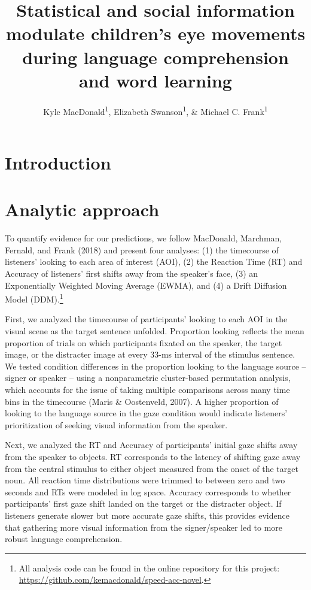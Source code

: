 \documentclass[man,floatsintext]{apa6}
\title{Statistical and social information modulate children's eye movements
during language comprehension and word learning}
\author{Kyle MacDonald\textsuperscript{1}, Elizabeth Swanson\textsuperscript{1},
\& Michael C. Frank\textsuperscript{1}}
\date{}
\affiliation{
\vspace{0.5cm}
\textsuperscript{1} Stanford University}
\let\rmarkdownfootnote\footnote%
\def\footnote{\protect\rmarkdownfootnote}
\begin{document}
\maketitle

\section{Introduction}\label{introduction}

\section{Analytic approach}\label{analytic-approach}

To quantify evidence for our predictions, we follow MacDonald, Marchman,
Fernald, and Frank (2018) and present four analyses: (1) the timecourse
of listeners' looking to each area of interest (AOI), (2) the Reaction
Time (RT) and Accuracy of listeners' first shifts away from the
speaker's face, (3) an Exponentially Weighted Moving Average (EWMA), and
(4) a Drift Diffusion Model (DDM).\footnote{All analysis code can be
  found in the online repository for this project:
  \url{https://github.com/kemacdonald/speed-acc-novel}.}

First, we analyzed the timecourse of participants' looking to each AOI
in the visual scene as the target sentence unfolded. Proportion looking
reflects the mean proportion of trials on which participants fixated on
the speaker, the target image, or the distracter image at every 33-ms
interval of the stimulus sentence. We tested condition differences in
the proportion looking to the language source -- signer or speaker --
using a nonparametric cluster-based permutation analysis, which accounts
for the issue of taking multiple comparisons across many time bins in
the timecourse (Maris \& Oostenveld, 2007). A higher proportion of
looking to the language source in the gaze condition would indicate
listeners' prioritization of seeking visual information from the
speaker.

Next, we analyzed the RT and Accuracy of participants' initial gaze
shifts away from the speaker to objects. RT corresponds to the latency
of shifting gaze away from the central stimulus to either object
measured from the onset of the target noun. All reaction time
distributions were trimmed to between zero and two seconds and RTs were
modeled in log space. Accuracy corresponds to whether participants'
first gaze shift landed on the target or the distracter object. If
listeners generate slower but more accurate gaze shifts, this provides
evidence that gathering more visual information from the signer/speaker
led to more robust language comprehension.
\end{document}
